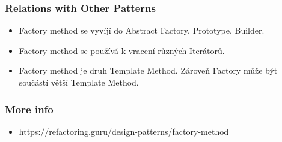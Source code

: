 \documentclass{article}
\begin{document}
\subsubsection{Relations with Other Patterns}
\begin{itemize}
  \item Factory method se vyvíjí do Abstract Factory, Prototype, Builder.
  \item Factory method se používá k vracení různých Iterátorů.
  \item Factory method je druh Template Method. Zároveň Factory může být součástí větší Template Method.
\end{itemize}
\subsubsection{More info}
\begin{itemize}
  \item https://refactoring.guru/design-patterns/factory-method
\end{itemize}
\end{document}
